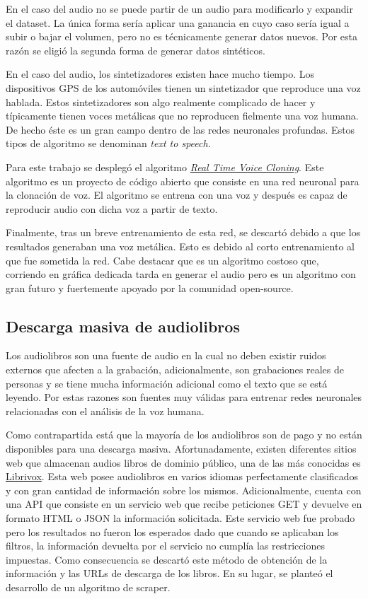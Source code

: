 En el caso del audio no se puede partir de un audio para modificarlo y expandir el \gls{dataset}. La única forma sería aplicar una ganancia en cuyo caso sería igual a subir o bajar el volumen, pero no es técnicamente generar datos nuevos. Por esta razón se eligió la segunda forma de generar datos sintéticos.

En el caso del audio, los sintetizadores existen hace mucho tiempo. Los dispositivos \gls{GPS} de los automóviles tienen un sintetizador que reproduce una voz hablada. Estos sintetizadores son algo realmente complicado de hacer y típicamente tienen voces metálicas que no reproducen fielmente una voz humana. De hecho éste es un gran campo dentro de las redes neuronales profundas. Estos tipos de algoritmo se denominan \textit{text to speech}.

Para este trabajo se desplegó el algoritmo \textit{\href{https://github.com/CorentinJ/Real-Time-Voice-Cloning}{Real Time Voice Cloning}}. Este algoritmo es un proyecto de código abierto que consiste en una red neuronal para la clonación de voz\cite{transfer_learning}. El algoritmo se entrena con una voz y después es capaz de reproducir audio con dicha voz a partir de texto.

Finalmente, tras un breve entrenamiento de esta red, se descartó debido a que los resultados generaban una voz metálica. Esto es debido al corto entrenamiento al que fue sometida la red. Cabe destacar que es un algoritmo costoso que, corriendo en gráfica dedicada tarda en generar el audio pero es un algoritmo con gran futuro y fuertemente apoyado por la comunidad open-source.

\subsection{Descarga masiva de audiolibros}
Los audiolibros son una fuente de audio en la cual no deben existir ruidos externos que afecten a la grabación, adicionalmente, son grabaciones reales de personas y se tiene mucha información adicional como el texto que se está leyendo. Por estas razones son fuentes muy válidas para entrenar redes neuronales relacionadas con el análisis de la voz humana.

Como contrapartida está que la mayoría de los audiolibros son de pago y no están disponibles para una descarga masiva. Afortunadamente, existen diferentes sitios web que almacenan audios libros de dominio público, una de las más conocidas es \href{https://librivox.org/}{Librivox}. Esta web posee audiolibros en varios idiomas perfectamente clasificados y con gran cantidad de información sobre los mismos. Adicionalmente, cuenta con una \gls{API} que consiste en un servicio web que recibe peticiones \gls{GET} y devuelve en formato \gls{HTML} o \gls{JSON} la información solicitada. Este servicio web fue probado pero los resultados no fueron los esperados dado que cuando se aplicaban los filtros, la información devuelta por el servicio no cumplía las restricciones impuestas. Como consecuencia se descartó este método de obtención de la información y las \glspl{URL} de descarga de los libros. En su lugar, se planteó el desarrollo de un algoritmo de \gls{scraper}.

